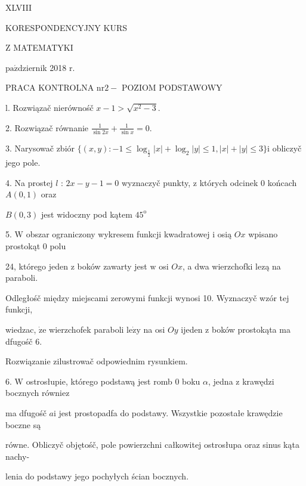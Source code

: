 \documentclass[a4paper,12pt]{article}
\begin{document}
XLVIII

KORESPONDENCYJNY KURS

Z MATEMATYKI

$\mathrm{p}\mathrm{a}\acute{\mathrm{z}}$dziernik 2018 $\mathrm{r}.$

PRACA KONTROLNA $\mathrm{n}\mathrm{r} 2-$ POZIOM PODSTAWOWY

l. Rozwiązač nierównośč $x-1>\sqrt{x^{2}-3}.$

2. Rozwiązač równanie $\displaystyle \frac{1}{\sin 2x}+\frac{1}{\sin x}=0.$

3. Narysowač zbiór $\{(x,y):-1\leq\log_{\frac{1}{2}}|x|+\log_{2}|y|\leq 1,|x|+|y|\leq 3\}\mathrm{i}$ obliczyč jego pole.

4. Na prostej $l$ : $2x-y-1=0$ wyznaczyč punkty, $\mathrm{z}$ których odcinek $0$ końcach $A(0,1)$ oraz

$B(0,3)$ jest widoczny pod kątem $45^{\mathrm{o}}$

5. $\mathrm{W}$ obszar ograniczony wykresem funkcji kwadratowej $\mathrm{i}$ osią $Ox$ wpisano prostokąt $0$ polu

24, którego jeden $\mathrm{z}$ boków zawarty jest $\mathrm{w}$ osi $Ox$, a dwa wierzchofki lezą na paraboli.

Odległośč między miejscami zerowymi funkcji wynosi 10. Wyznaczyč wzór tej funkcji,

wiedzac, $\dot{\mathrm{z}}\mathrm{e}$ wierzchofek paraboli $\mathrm{l}\mathrm{e}\dot{\mathrm{z}}\mathrm{y}$ na osi $Oy$ ijeden $\mathrm{z}$ boków prostokąta ma dfugośč 6.

Rozwiązanie zilustrowač odpowiednim rysunkiem.

6. $\mathrm{W}$ ostrosłupie, którego podstawą jest romb $0$ boku $\alpha$, jedna $\mathrm{z}$ krawędzi bocznych równiez

ma dfugośč $a\mathrm{i}$ jest prostopadfa do podstawy. Wszystkie pozostałe krawędzie boczne są

równe. Obliczyč objętośč, pole powierzchni całkowitej ostrosłupa oraz sinus kąta nachy-

lenia do podstawy jego pochyłych ścian bocznych.
\end{document}
